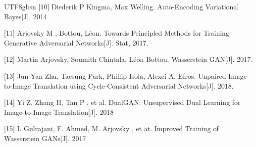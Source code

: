 \documentclass{article}
\begin{document}
\begin{CJK*}{UTF8}{gbsn}
[10] Diederik P Kingma, Max Welling. Auto-Encoding Variational Bayes[J]. 2014

[11] Arjovsky M , Bottou, L\'{e}on. Towards Principled Methods for Training Generative Adversarial Networks[J]. Stat, 2017.

[12] Martin Arjovsky, Soumith Chintala, L\'{e}on Bottou. Wasserstein GAN[J]. 2017.

[13] Jun-Yan Zhu, Taesung Park, Phillip Isola, Alexei A. Efros. Unpaired Image-to-Image Translation using Cycle-Consistent Adversarial Networks[J]. 2018.

[14] Yi Z, Zhang H, Tan P , et al. DualGAN: Unsupervised Dual Learning for Image-to-Image Translation[J]. 2018

[15] I. Gulrajani, F. Ahmed, M. Arjovsky , et at. Improved Training of Wasserstein GANs[J]. 2017

\end{CJK*}
\end{document}
